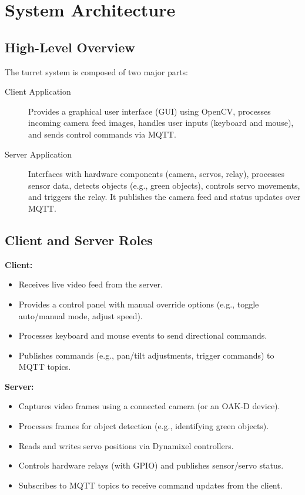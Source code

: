 \documentclass[12pt]{article}
\begin{document}
\section{System Architecture}

\subsection{High-Level Overview}
The turret system is composed of two major parts:
\begin{description}
    \item[Client Application] Provides a graphical user interface (GUI) using OpenCV, processes incoming camera feed images, handles user inputs (keyboard and mouse), and sends control commands via MQTT.
    \item[Server Application] Interfaces with hardware components (camera, servos, relay), processes sensor data, detects objects (e.g., green objects), controls servo movements, and triggers the relay. It publishes the camera feed and status updates over MQTT.
\end{description}

\subsection{Client and Server Roles}
\textbf{Client:}
\begin{itemize}[leftmargin=*, label={--}]
    \item Receives live video feed from the server.
    \item Provides a control panel with manual override options (e.g., toggle auto/manual mode, adjust speed).
    \item Processes keyboard and mouse events to send directional commands.
    \item Publishes commands (e.g., pan/tilt adjustments, trigger commands) to MQTT topics.
\end{itemize}

\textbf{Server:}
\begin{itemize}[leftmargin=*, label={--}]
    \item Captures video frames using a connected camera (or an OAK-D device).
    \item Processes frames for object detection (e.g., identifying green objects).
    \item Reads and writes servo positions via Dynamixel controllers.
    \item Controls hardware relays (with GPIO) and publishes sensor/servo status.
    \item Subscribes to MQTT topics to receive command updates from the client.
\end{itemize}
\end{document}
